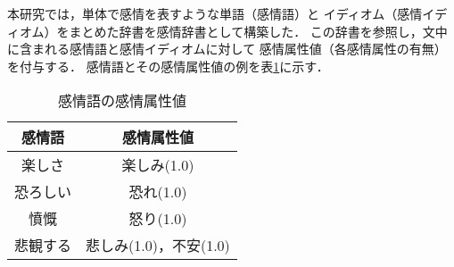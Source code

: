 \documentclass[japanese]{jnlp_1.3c}
\begin{document}
本研究では，単体で感情を表すような単語（感情語）と
イディオム（感情イディオム）をまとめた辞書を感情辞書として構築した．
この辞書を参照し，文中に含まれる感情語と感情イディオムに対して
感情属性値（各感情属性の有無）を付与する．
感情語とその感情属性値の例を表\ref{tb:eword_ex}に示す．

\begin{table}[b]
\begin{center}
\caption{感情語の感情属性値}
\begin{tabular}{|c|c|}
\hline
感情語	&	感情属性値	\\ \hline \hline
楽しさ	&	楽しみ(1.0)	\\ \hline
恐ろしい	&	恐れ(1.0)	\\ \hline
憤慨	&	怒り(1.0)	\\	\hline
悲観する	&	悲しみ(1.0)，不安(1.0)	\\ \hline
\end{tabular}
\label{tb:eword_ex}
\end{center}
\end{table}
\end{document}
